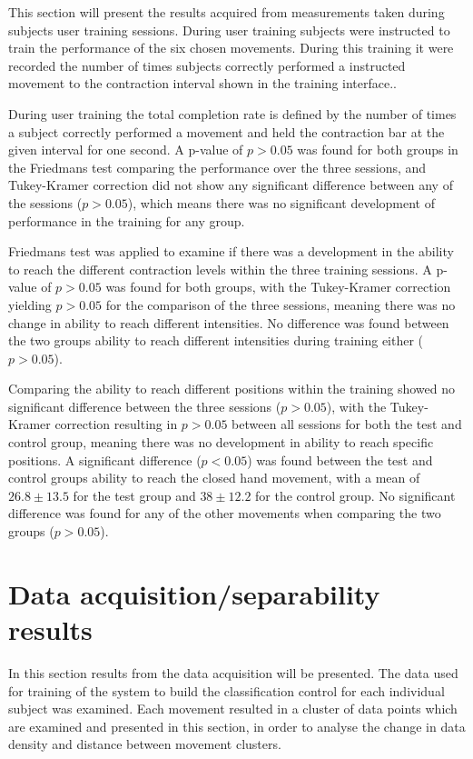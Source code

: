 This section will present the results acquired from measurements taken during subjects user training sessions. During user training subjects were instructed to train the performance of the six chosen movements. During this training it were recorded the number of times subjects correctly performed a instructed movement to the contraction interval shown in the training interface..  

During user training the total completion rate is defined by the number of times a subject correctly performed a movement and held the contraction bar at the given interval for one second. A p-value of $p > 0.05$ was found for both groups in the Friedmans test comparing the performance over the three sessions, and Tukey-Kramer correction did not show any significant difference between any of the sessions ($p > 0.05$), which means there was no significant development of performance in the training for any group. 

Friedmans test was applied to examine if there was a development in the ability to reach the different contraction levels within the three training sessions. A p-value of $p > 0.05$ was found for both groups, with the Tukey-Kramer correction yielding $p > 0.05$ for the comparison of the three sessions, meaning there was no change in ability to reach different intensities. No difference was found between the two groups ability to reach different intensities during training either ($p > 0.05$).

Comparing the ability to reach different positions within the training showed no significant difference between the three sessions ($p > 0.05$), with the Tukey-Kramer correction resulting in $p > 0.05$ between all sessions for both the test and control group, meaning there was no development in ability to reach specific positions. A significant difference ($p < 0.05$) was found between the test and control groups ability to reach the closed hand movement, with a mean of $26.8 \pm13.5$ for the test group and $38 \pm12.2$ for the control group. No significant difference was found for any of the other movements when comparing the two groups ($p > 0.05$).

\section{Data acquisition/separability results}
In this section results from the data acquisition will be presented. The data used for training of the system to build the classification control for each individual subject was examined. Each movement resulted in a cluster of data points which are examined and presented in this section, in order to analyse the change in data density and distance between movement clusters.

